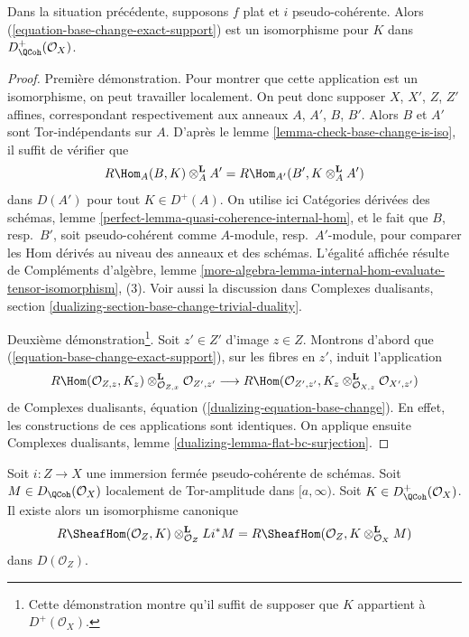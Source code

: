 \begin{lemma}
\label{lemma-flat-bc-sheaf-with-exact-support}
Dans la situation précédente, supposons $f$ plat et $i$ pseudo-cohérente. Alors (\ref{equation-base-change-exact-support}) est un isomorphisme pour $K$ dans $D^+_\QCoh(\mathcal{O}_X)$.
\end{lemma}

\begin{proof}
Première démonstration. Pour montrer que cette application est un isomorphisme, on peut travailler localement. On peut donc supposer $X$, $X'$, $Z$, $Z'$ affines, correspondant respectivement aux anneaux $A$, $A'$, $B$, $B'$. Alors $B$ et $A'$ sont Tor-indépendants sur $A$. D'après le lemme \ref{lemma-check-base-change-is-iso}, il suffit de vérifier que
$$
R\Hom_A(B, K) \otimes_A^\mathbf{L} A' =
R\Hom_{A'}(B', K \otimes_A^\mathbf{L} A')
$$
dans $D(A')$ pour tout $K \in D^+(A)$. On utilise ici Catégories dérivées des schémas, lemme \ref{perfect-lemma-quasi-coherence-internal-hom}, et le fait que $B$, resp.\ $B'$, soit pseudo-cohérent comme $A$-module, resp.\ $A'$-module, pour comparer les Hom dérivés au niveau des anneaux et des schémas. L'égalité affichée résulte de Compléments d'algèbre, lemme \ref{more-algebra-lemma-internal-hom-evaluate-tensor-isomorphism}, (3). Voir aussi la discussion dans Complexes dualisants, section \ref{dualizing-section-base-change-trivial-duality}.

\medskip\noindent
Deuxième démonstration\footnote{Cette démonstration montre qu'il suffit de supposer que $K$ appartient à $D^+(\mathcal{O}_X)$.}. Soit $z' \in Z'$ d'image $z \in Z$. Montrons d'abord que (\ref{equation-base-change-exact-support}), sur les fibres en $z'$, induit l'application
$$
R\Hom(\mathcal{O}_{Z, z}, K_z)
\otimes_{\mathcal{O}_{Z, x}}^\mathbf{L} \mathcal{O}_{Z', z'}
\longrightarrow
R\Hom(\mathcal{O}_{Z', z'},
K_z \otimes_{\mathcal{O}_{X, z}}^\mathbf{L} \mathcal{O}_{X', z'})
$$
de Complexes dualisants, équation (\ref{dualizing-equation-base-change}). En effet, les constructions de ces applications sont identiques. On applique ensuite Complexes dualisants, lemme \ref{dualizing-lemma-flat-bc-surjection}.
\end{proof}

\begin{lemma}
\label{lemma-sheaf-with-exact-support-tensor}
Soit $i : Z \to X$ une immersion fermée pseudo-cohérente de schémas. Soit $M \in D_\QCoh(\mathcal{O}_X)$ localement de Tor-amplitude dans $[a, \infty)$. Soit $K \in D_\QCoh^+(\mathcal{O}_X)$. Il existe alors un isomorphisme canonique
$$
R\SheafHom(\mathcal{O}_Z, K) \otimes_{\mathcal{O}_Z}^\mathbf{L} Li^*M =
R\SheafHom(\mathcal{O}_Z, K \otimes_{\mathcal{O}_X}^\mathbf{L} M)
$$
dans $D(\mathcal{O}_Z)$.
\end{lemma}

